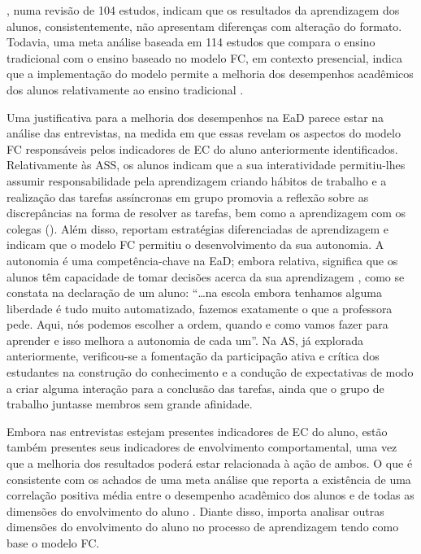 \documentclass[portuguese]{textolivre}
\begin{document}
\textcite{lockman_online_2020}, numa revisão de 104 estudos, indicam que os resultados da aprendizagem dos alunos, consistentemente, não apresentam diferenças com alteração do formato. Todavia, uma meta análise baseada em 114 estudos que compara o ensino tradicional com o ensino baseado no modelo FC, em contexto presencial, indica que a implementação do modelo permite a melhoria dos desempenhos acadêmicos dos alunos relativamente ao ensino tradicional \cite{van_alten_effects_2019}.

Uma justificativa para a melhoria dos desempenhos na EaD parece estar na análise das entrevistas, na medida em que essas revelam os aspectos do modelo FC responsáveis pelos indicadores de EC do aluno anteriormente identificados. Relativamente às ASS, os alunos indicam que a sua interatividade permitiu-lhes assumir responsabilidade pela aprendizagem criando hábitos de trabalho e a realização das tarefas assíncronas em grupo promovia a reflexão sobre as discrepâncias na forma de resolver as tarefas, bem como a aprendizagem com os colegas (). Além disso, reportam estratégias diferenciadas de aprendizagem e indicam que o modelo FC permitiu o desenvolvimento da sua autonomia. A autonomia é uma competência-chave na EaD; embora relativa, significa que os alunos têm capacidade de tomar decisões acerca da sua aprendizagem \cite{moore_educacao_2008}, como se constata na declaração de um aluno: “…na escola embora tenhamos alguma liberdade é tudo muito automatizado, fazemos exatamente o que a professora pede. Aqui, nós podemos escolher a ordem, quando e como vamos fazer para aprender e isso melhora a autonomia de cada um”. Na AS, já explorada anteriormente, verificou-se a fomentação da participação ativa e crítica dos estudantes na construção do conhecimento e a condução de expectativas de modo a criar alguma interação para a conclusão das tarefas, ainda que o grupo de trabalho juntasse membros sem grande afinidade.

Embora nas entrevistas estejam presentes indicadores de EC do aluno, estão também presentes seus indicadores de envolvimento comportamental, uma vez que a melhoria dos resultados poderá estar relacionada à ação de ambos. O que é consistente com os achados de uma meta análise que reporta a existência de uma correlação positiva média entre o desempenho acadêmico dos alunos e de todas as dimensões do envolvimento do aluno \cite{lei_relationships_2018}. Diante disso, importa analisar outras dimensões do envolvimento do aluno no processo de aprendizagem tendo como base o modelo FC. 
\end{document}

